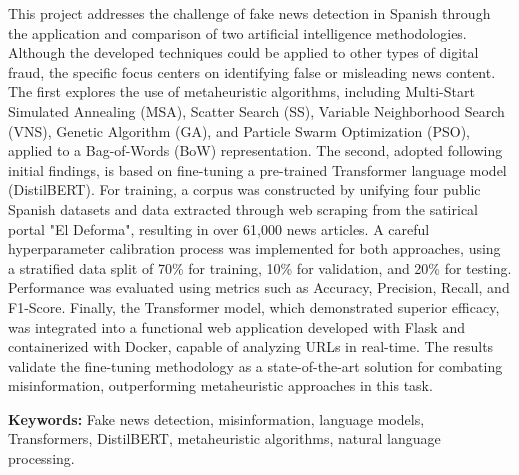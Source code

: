 This project addresses the challenge of fake news detection in Spanish through the application and comparison of two artificial intelligence methodologies. Although the developed techniques could be applied to other types of digital fraud, the specific focus centers on identifying false or misleading news content. The first explores the use of metaheuristic algorithms, including Multi-Start Simulated Annealing (MSA), Scatter Search (SS), Variable Neighborhood Search (VNS), Genetic Algorithm (GA), and Particle Swarm Optimization (PSO), applied to a Bag-of-Words (BoW) representation. The second, adopted following initial findings, is based on fine-tuning a pre-trained Transformer language model (DistilBERT). For training, a corpus was constructed by unifying four public Spanish datasets and data extracted through web scraping from the satirical portal "El Deforma", resulting in over 61,000 news articles. A careful hyperparameter calibration process was implemented for both approaches, using a stratified data split of 70\% for training, 10\% for validation, and 20\% for testing. Performance was evaluated using metrics such as Accuracy, Precision, Recall, and F1-Score. Finally, the Transformer model, which demonstrated superior efficacy, was integrated into a functional web application developed with Flask and containerized with Docker, capable of analyzing URLs in real-time. The results validate the fine-tuning methodology as a state-of-the-art solution for combating misinformation, outperforming metaheuristic approaches in this task.

\vspace{0.9cm}
\textbf{Keywords:} Fake news detection, misinformation, language models, Transformers, DistilBERT, metaheuristic algorithms, natural language processing.

\shipout\null
